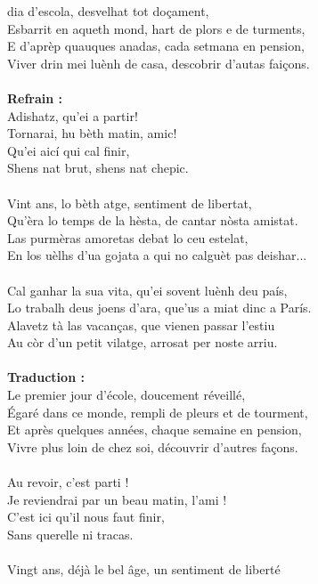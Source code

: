 
 dia d’escola, desvelhat tot doçament,
\\Esbarrit en aqueth mond, hart de plors e de turments,
\\E d'aprèp quauques anadas, cada setmana en pension,
\\Viver drin mei luènh de casa, descobrir d’autas faiçons.
\\\\\textbf{Refrain :}
\\Adishatz, qu’ei a partir!
\\Tornarai, hu bèth matin, amic!
\\Qu’ei aicí qui cal finir,
\\Shens nat brut, shens nat chepic.
\\\\Vint ans, lo bèth atge, sentiment de libertat,
\\Qu’èra lo temps de la hèsta, de cantar nòsta amistat.
\\Las purmèras amoretas debat lo ceu estelat,
\\En los uèlhs d’ua gojata a qui no calguèt pas deishar...
\\\\Cal ganhar la sua vita, qu’ei sovent luènh deu país,
\\Lo trabalh deus joens d'ara, que'us a miat dinc a París.
\\Alavetz tà las vacanças, que vienen passar l’estiu
\\Au còr d’un petit vilatge, arrosat per noste arriu.
\\\\\textbf{Traduction : }
\\Le premier jour d'école, doucement réveillé,
\\Égaré dans ce monde, rempli de pleurs et de tourment,
\\Et après quelques années, chaque semaine en pension,
\\Vivre plus loin de chez soi, découvrir d'autres façons.
\\\\Au revoir, c'est parti !
\\Je reviendrai par un beau matin, l'ami !
\\C'est ici qu'il nous faut finir,
\\Sans querelle ni tracas.
\\\\Vingt ans, déjà le bel âge, un sentiment de liberté
